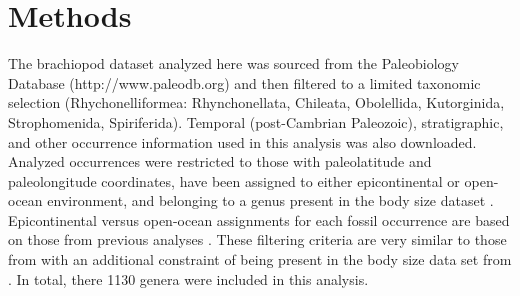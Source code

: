 \documentclass[11pt]{article}
\begin{document}




\section*{Methods}

The brachiopod dataset analyzed here was sourced from the Paleobiology Database (http://www.paleodb.org) and then filtered to a limited taxonomic selection (Rhychonelliformea: Rhynchonellata, Chileata, Obolellida, Kutorginida, Strophomenida, Spiriferida). Temporal (post-Cambrian Paleozoic), stratigraphic, and other occurrence information used in this analysis was also downloaded. Analyzed occurrences were restricted to those with paleolatitude and paleolongitude coordinates, have been assigned to either epicontinental or open-ocean environment, and belonging to a genus present in the body size dataset \citep{Payne2014}. Epicontinental versus open-ocean assignments for each fossil occurrence are based on those from previous analyses \citet{Miller2009a,Foote2013,Ritterbush2017}. These filtering criteria are very similar to those from \citet{Foote2013} with an additional constraint of being present in the body size data set from \citet{Payne2014}. In total, there 1130 genera were included in this analysis.
\end{document}
